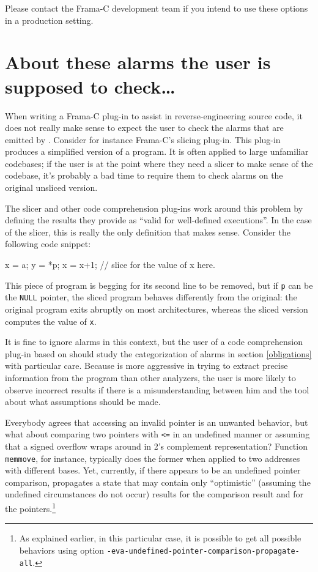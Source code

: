 \documentclass{frama-c-book}
\begin{document}
Please contact the Frama-C development team if you intend to use these
options in a production setting.

\section{About these alarms the user is supposed to check\ldots}

When writing a Frama-C plug-in to assist in
reverse-engineering source code, it does not really make sense to expect
the user to check the alarms that are emitted by \Eva{}.
Consider for instance Frama-C's slicing plug-in. This plug-in produces
a simplified version of a program. It is often applied to large unfamiliar
codebases; if the user is at the point where they need a slicer to make
sense of the codebase, it's probably a bad time to require
them to check alarms on the original unsliced version.

The slicer and other code comprehension plug-ins work around this problem
by defining the results they provide as ``valid for well-defined executions''.
In the case of the slicer, this is really the only definition that makes
sense. Consider the following code snippet:

\begin{listing}{1}
x = a;
y = *p;
x = x+1;
// slice for the value of x here.
\end{listing}

This piece of program is begging for its second line to be removed, but
if \lstinline|p| can be the \lstinline|NULL| pointer, the sliced
program behaves differently from the original: the original program
exits abruptly on most architectures, whereas the sliced version
computes the value of \lstinline|x|.

It is fine to ignore alarms in this context,
but the user of a code comprehension plug-in based on \Eva{}
should study the categorization of alarms in section \ref{obligations}
with particular care.
Because \Eva{} is more aggressive
in trying to extract precise information from the program than other
analyzers, the user is more likely to observe incorrect results if there
is a misunderstanding between him and the tool about what assumptions
should be made.

Everybody agrees that accessing an invalid pointer is an unwanted behavior,
but what about comparing two pointers with \lstinline|<=| in an undefined manner or
assuming that a signed overflow wraps around in 2's complement
representation? Function \lstinline|memmove|, for instance, typically does the
former when applied to two addresses with different bases.
%
Yet, currently, if there appears to be an undefined pointer comparison, \Eva{}
propagates a state that may contain only ``optimistic''
(assuming the undefined circumstances do not occur) results
for the comparison result and for the pointers.\footnote{As explained earlier, in this particular case, it is
possible to get all possible behaviors using option
\lstinline|-eva-undefined-pointer-comparison-propagate-all|.}
\end{document}
